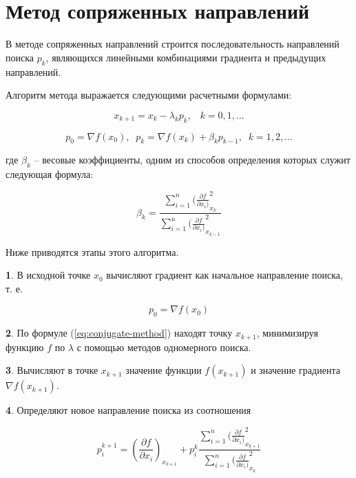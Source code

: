 \documentclass[a4paper, 12pt, titlepage]{article}
\theoremstyle{definition}
\theoremstyle{plain}
\theoremstyle{plain}
\begin{document}
\section{Метод сопряженных направлений}

В методе сопряженных направлений строится последовательность направлений поиска
$p_{k}$, являющихся линейными комбинациями градиента и предыдущих
направлений.

Алгоритм метода выражается следующими расчетными формулами:

\begin{equation}
 \label{eq:conjugate-method}
 x_{k + 1} = x_{k} - \lambda_{k} p_{k}, \;\;\; k = 0, 1, \ldots
\end{equation}

\begin{equation}
 p_{0} = \nabla f(x_{0}), \;\; p_{k} = \nabla f(x_{k}) + \beta_{k} p_{k - 1},
 \;\; k = 1, 2, \ldots
\end{equation}

где $\beta_{k}$ -- весовые коэффициенты, одним из способов определения которых
служит следующая формула:

\begin{equation}
 \beta_{k} = 
 \frac{\sum \limits_{i = 1}^{n}(\frac{\partial f}{\partial x_{i})}^{2}_{x_{k}}}
 {\sum \limits_{i = 1}^{n}(\frac{\partial f}{\partial x_{i})}^{2}_{x_{k - 1}}}
\end{equation}

Ниже приводятся этапы этого алгоритма.

\textbf{1}. В исходной точке $x_{0}$ вычисляют градиент как начальное 
направление поиска, т. е.

\begin{equation}
 p_{0} = \nabla f(x_{0})
\end{equation}

\textbf{2}. По формуле (\ref{eq:conjugate-method}) находят точку $x_{k + 1}$,
минимизируя функцию $f$ по $\lambda$ с помощью методов одномерного поиска.

\textbf{3}. Вычисляют в точке $x_{k + 1}$ значение функции $f(x_{k + 1})$ и
значение градиента $\nabla f(x_{k + 1})$.

\textbf{4}. Определяют новое направление поиска из соотношения

\begin{equation}
 p_{i}^{k + 1} = (\frac{\partial f}{\partial x_{i}})_{x_{k + 1}} + p_{i}^{k}
 \frac
 {\sum \limits_{i = 1}^{n}(\frac{\partial f}{\partial x_{i})}^{2}_{x_{k + 1}}}
 {\sum \limits_{i = 1}^{n}(\frac{\partial f}{\partial x_{i})}^{2}_{x_{k}}}
\end{equation}
\end{document}

